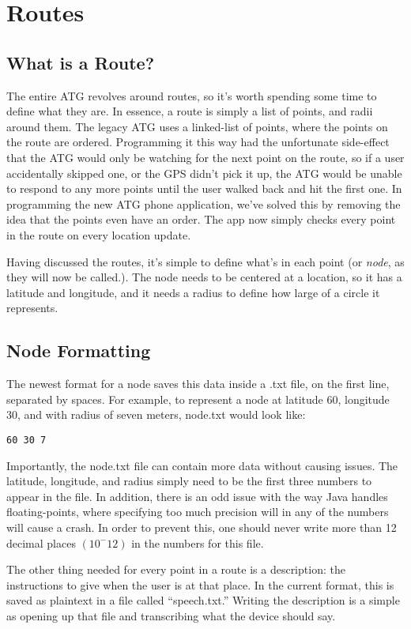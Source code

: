 \section{Routes}
\subsection{What is a Route?}
The entire ATG revolves around routes, so it's worth spending some time to define what they are. In essence, a route is simply a list of
points, and radii around them. The legacy ATG uses a linked-list of points, where the points on the route are ordered. Programming it this way
had the unfortunate side-effect that the ATG would only be watching for the next point on the route, so if a user accidentally skipped one,
or the GPS didn't pick it up, the ATG would be unable to respond to any more points until the user walked back and hit the first one.
In programming the new ATG phone application, we've solved this by removing the idea that the points even have an order. The app now simply
checks every point in the route on every location update.

Having discussed the routes, it's simple to define what's in each point (or \emph{node}, as they will now be called.). The node needs to be
centered at a location, so it has a latitude and longitude, and it needs a radius to define how large of a circle it represents.

\subsection{Node Formatting}
The newest format for a node saves this data inside a .txt file, on the first line, separated by spaces. For example, to represent a node at
latitude 60, longitude 30, and with radius of seven meters, node.txt would look like:
\begin{verbatim}
60 30 7
\end{verbatim}
Importantly, the node.txt file can contain more data without causing issues. The latitude, longitude, and radius simply need to be the first
three numbers to appear in the file. In addition, there is an odd issue with the way Java handles floating-points, where specifying too much
precision will in any of the numbers will cause a crash. In order to prevent this, one should never write more than 12 decimal places
$(10^-12)$ in the numbers for this file.

The other thing needed for every point in a route is a description: the instructions to give when the user is at that place. In the current
format, this is saved as plaintext in a file called ``speech.txt.'' Writing the description is a simple as opening up that file and 
transcribing what the device should say.

